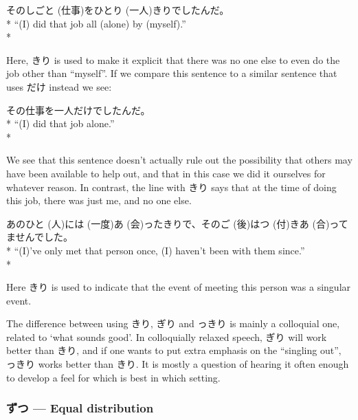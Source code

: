 \documentclass[11pt, b5paper, twoside, openright, onecolumn]{book}
\makeatletter
\newcommand*{\rubystack}[2]{{\relscale{0.5}%
  \begin{tabular}[b]{@{}c@{}}%
    {#1}\\%
   {\textscale{2}{#2}}%
  \end{tabular}}%
}
\DeclareRobustCommand*{\ruby}[2]{%
  \mbox{%
    \setlength{\parskip}{0ex}%
    \BeginAccSupp{method=pdfstringdef,ActualText={#1}}%
      \rubystack{\phantom{#2}}{#1}%
      \llap{%
        \rubystack{#2}{\phantom{#1}}%
      }%
    \EndAccSupp{}%
  }%
}
\renewcommand*{\ruby}[2]{#2 (#1)}%
\newenvironment{exampleblock}{
\setlength{\parindent}{0.6in}
\begin{minipage}[t]{\dimexpr\textwidth-\parindent}}
{\end{minipage}}
\makeatother
\begin{document}
\vspace{0.4cm}
\begin{exampleblock}
その\ruby{仕事}{しごと}を\ruby{一人}{ひとり}きりでしたんだ。 \\* 
“(I) did that job all (alone) by (myself).” \\* 
\end{exampleblock}
\vspace{0.2cm}

Here‚ きり is used to make it explicit that there was no one else to even do the job other than “myself”. If we compare this sentence to a similar sentence that uses だけ instead we see:

\vspace{0.4cm}
\begin{exampleblock}
その仕事を一人だけでしたんだ。 \\* 
“(I) did that job alone.” \\* 
\end{exampleblock}
\vspace{0.2cm}

We see that this sentence doesn’t actually rule out the possibility that others may have been available to help out‚ and that in this case we did it ourselves for whatever reason. In contrast‚ the line with きり says that at the time of doing this job‚ there was just me‚ and no one else.

\vspace{0.4cm}
\begin{exampleblock}
あの\ruby{人}{ひと}には\ruby{一度}{}\ruby{会}{あ}ったきりで、その\ruby{後}{ご}は\ruby{付}{つ}き\ruby{合}{あ}ってませんでした。 \\* 
“(I)’ve only met that person once‚ (I) haven’t been with them since.” \\* 
\end{exampleblock}
\vspace{0.2cm}

Here きり is used to indicate that the event of meeting this person was a singular event.

The difference between using きり‚ ぎり and っきり is mainly a colloquial one‚ related to ‘what sounds good’. In colloquially relaxed speech‚ ぎり will work better than きり‚ and if one wants to put extra emphasis on the “singling out”‚ っきり works better than きり. It is mostly a question of hearing it often enough to develop a feel for which is best in which setting.

\subsubsection{ずつ — Equal distribution}
\end{document}
